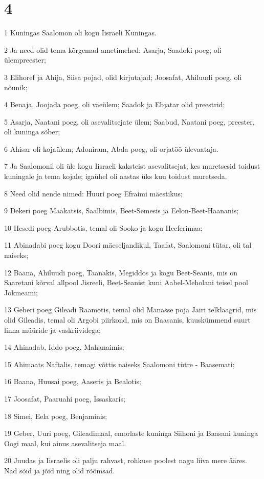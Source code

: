 \chapter{4}

\par 1 Kuningas Saalomon oli kogu Iisraeli Kuningas.
\par 2 Ja need olid tema kõrgemad ametimehed: Asarja, Saadoki poeg, oli ülempreester;
\par 3 Elihoref ja Ahija, Siisa pojad, olid kirjutajad; Joosafat, Ahiluudi poeg, oli nõunik;
\par 4 Benaja, Joojada poeg, oli väeülem; Saadok ja Ebjatar olid preestrid;
\par 5 Asarja, Naatani poeg, oli asevalitsejate ülem; Saabud, Naatani poeg, preester, oli kuninga sõber;
\par 6 Ahisar oli kojaülem; Adoniram, Abda poeg, oli orjatöö ülevaataja.
\par 7 Ja Saalomonil oli üle kogu Iisraeli kaksteist asevalitsejat, kes muretsesid toidust kuningale ja tema kojale; igaühel oli aastas üks kuu toidust muretseda.
\par 8 Need olid nende nimed: Huuri poeg Efraimi mäestikus;
\par 9 Dekeri poeg Maakatsis, Saalbimis, Beet-Semesis ja Eelon-Beet-Haananis;
\par 10 Hesedi poeg Arubbotis, temal oli Sooko ja kogu Heeferimaa;
\par 11 Abinadabi poeg kogu Doori mäeseljandikul, Taafat, Saalomoni tütar, oli tal naiseks;
\par 12 Baana, Ahiluudi poeg, Taanakis, Megiddos ja kogu Beet-Seanis, mis on Saaretani kõrval allpool Jisreeli, Beet-Seanist kuni Aabel-Meholani teisel pool Jokmeami;
\par 13 Geberi poeg Gileadi Raamotis, temal olid Manasse poja Jairi telklaagrid, mis olid Gileadis, temal oli Argobi piirkond, mis on Baasanis, kuuskümmend suurt linna müüride ja vaskriividega;
\par 14 Ahinadab, Iddo poeg, Mahanaimis;
\par 15 Ahimaats Naftalis, temagi võttis naiseks Saalomoni tütre - Baasemati;
\par 16 Baana, Huusai poeg, Aaseris ja Bealotis;
\par 17 Joosafat, Paaruahi poeg, Issaskaris;
\par 18 Simei, Eela poeg, Benjaminis;
\par 19 Geber, Uuri poeg, Gileadimaal, emorlaste kuninga Siihoni ja Baasani kuninga Oogi maal, kui ainus asevalitseja maal.
\par 20 Juudas ja Iisraelis oli palju rahvast, rohkuse poolest nagu liiva mere ääres. Nad sõid ja jõid ning olid rõõmsad.

